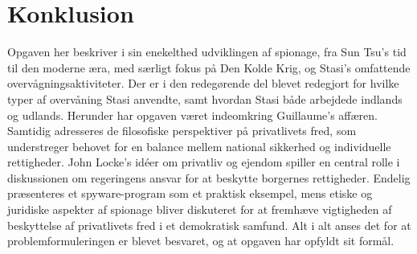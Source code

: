 \newpage
\section{Konklusion}
Opgaven her beskriver i sin enekelthed udviklingen af spionage, fra Sun Tsu's tid til den moderne æra, med særligt fokus på Den Kolde Krig, og Stasi's omfattende overvågningsaktiviteter. Der er i den redegørende del blevet redegjort for hvilke typer af overvåning Stasi anvendte, samt hvordan Stasi både arbejdede indlands og udlands. Herunder har opgaven været indeomkring Guillaume's affæren. Samtidig adresseres de filosofiske perspektiver på privatlivets fred, som understreger behovet for en balance mellem national sikkerhed og individuelle rettigheder. John Locke's idéer om privatliv og ejendom spiller en central rolle i diskussionen om regeringens ansvar for at beskytte borgernes rettigheder. Endelig præsenteres et spyware-program som et praktisk eksempel, mens etiske og juridiske aspekter af spionage bliver diskuteret for at fremhæve vigtigheden af beskyttelse af privatlivets fred i et demokratisk samfund. Alt i alt anses det for at problemformuleringen er blevet besvaret, og at opgaven har opfyldt sit formål.